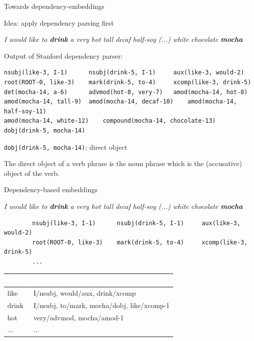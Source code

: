 \documentclass[12pt]{beamer}
\begin{document}
\begin{frame}[fragile]{Towards dependency-embeddings}

Idea: apply dependency parsing first 

\emph{I would like to \textbf{drink} a very hot tall decaf half-soy (...) white chocolate \textbf{mocha}}

Output of Stanford dependency parser:

\begin{tiny}
\begin{verbatim}
nsubj(like-3, I-1)	 	nsubj(drink-5, I-1)	 	aux(like-3, would-2)	 
root(ROOT-0, like-3)	mark(drink-5, to-4)	 	xcomp(like-3, drink-5)	 
det(mocha-14, a-6)	 	advmod(hot-8, very-7)	amod(mocha-14, hot-8) 
amod(mocha-14, tall-9)	amod(mocha-14, decaf-10)	amod(mocha-14, half-soy-11)	
amod(mocha-14, white-12)	compound(mocha-14, chocolate-13)	 
dobj(drink-5, mocha-14)
\end{verbatim}
\end{tiny}
	
\texttt{dobj(drink-5, mocha-14)}: direct object

\begin{small}
The direct object of a verb phrase is the noun phrase which is the (accusative) object of the verb.	
\end{small}


\end{frame}


\begin{frame}[fragile]{Dependency-based embeddings}
	

	\emph{I would like to \textbf{drink} a very hot tall decaf half-soy (...) white chocolate \textbf{mocha}}

	\begin{tiny}
		\begin{verbatim}
		nsubj(like-3, I-1)	 	nsubj(drink-5, I-1)	 	aux(like-3, would-2)	 
		root(ROOT-0, like-3)	mark(drink-5, to-4)	 	xcomp(like-3, drink-5)	 
		...
		\end{verbatim}
	\end{tiny}
	
\begin{small}
	

\begin{table}
	\begin{tabular}{l|l}
		\rowcolor{76abdf} \textcolor{white}{\textbf{Word}} & \textcolor{white}{\textbf{Dependency Context}} \\ \toprule
		like & I/nsubj, would/aux, drink/xcomp \\
		\rowcolor{gray!10} drink & I/nsubj, to/mark,  mocha/dobj, like/xcomp-1 \\
		hot & very/advmod, mocha/amod-1 \\
		\rowcolor{gray!10} ... & ... \\
	\end{tabular}
\end{table}
\end{small}
	
\end{frame}
\end{document}
